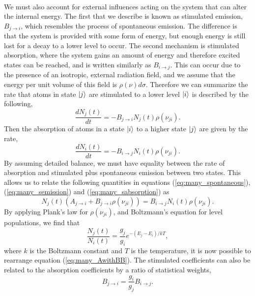 \\
We must also account for external influences acting on the system that can alter the internal energy. The first that we describe is known as stimulated emission, $B_{j \rightarrow i}$, which resembles the process of spontaneous emission. The difference is that the system is provided with some form of energy, but enough energy is still lost for a decay to a lower level to occur. The second mechanism is stimulated absorption, where the system gains an amount of energy and therefore excited states can be reached, and is written similarly as $B_{i \rightarrow j}$. This can occur due to the presence of an isotropic, external radiation field, and we assume that the energy per unit volume of this field is $\rho(\nu)d\sigma$. Therefore we can summarize the rate that atoms in state $\Ket{j}$ are stimulated to a lower level $\Ket{i}$ is described by the following,
\begin{equation}\label{eq:many_semission}
\frac{d N_j(t)}{dt} = - B_{j \rightarrow i}N_j(t)\rho(\nu_{ji}).
\end{equation}
Then the absorption of atoms in a state $\Ket{i}$ to a higher state $\Ket{j}$ are given by the rate,
\begin{equation}\label{eq:many_sabsorption}
\frac{d N_i(t)}{dt} = - B_{i \rightarrow j}N_i(t)\rho(\nu_{ji}).
\end{equation}
By assuming detailed balance, we must have equality between the rate of absorption and stimulated plus spontaneous emission between two states. This allows us to relate the following quantities in equations (\ref{eq:many_spontaneous}), (\ref{eq:many_semission}) and (\ref{eq:many_sabsorption}) as
\begin{equation}\label{eq:many_AwithBB}
N_j(t)(A_{j \rightarrow i}+B_{j \rightarrow i}\rho(\nu_{ji})) = B_{i \rightarrow j}N_i(t)\rho(\nu_{ji}).
\end{equation}
By applying Plank's law for $\rho(\nu_{ji})$, and Boltzmann's equation for level populations, we find that
\begin{equation}\label{eq:many_boltz}
\frac{N_j(t)}{N_i(t)} = \frac{g_j}{g_i}e^{-(E_j-E_i)/kT},
\end{equation}
where $k$ is the Boltzmann constant and $T$ is the temperature, it is now possible to rearrange equation (\ref{eq:many_AwithBB}). The stimulated coefficients can also be related to the absorption coefficients by a ratio of statistical weights,
\begin{equation}\label{eq:many_BtoB}
B_{j \rightarrow i} = \frac{g_i}{g_j}B_{i \rightarrow j}.
\end{equation}
